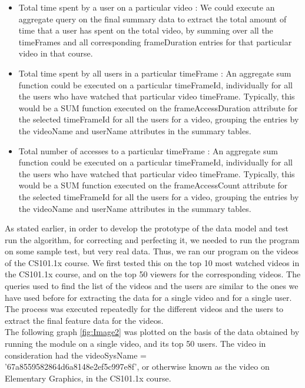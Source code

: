 \documentclass[16pt]{report}
\begin{document}
\begin{itemize}

\item Total time spent by a user on a particular video : We could execute an aggregate query on the final summary data to extract the total amount of time that a user has spent on the total video, by summing over all the timeFrames and all corresponding frameDuration entries for that particular video in that course.

\item Total time spent by all users in a particular timeFrame : An aggregate sum function could be executed on a particular timeFrameId, individually for all the users who have watched that particular video timeFrame. Typically, this would be a SUM function executed on the frameAccessDuration attribute for the selected timeFrameId for all the users for a video, grouping the entries by the videoName and userName attributes in the summary tables.

\item Total number of accesses to a particular timeFrame : An aggregate sum function could be executed on a particular timeFrameId, individually for all the users who have watched that particular video timeFrame. Typically, this would be a SUM function executed on the frameAccessCount attribute for the selected timeFrameId for all the users for a video, grouping the entries by the videoName and userName attributes in the summary tables.

\end{itemize}

As stated earlier, in order to develop the prototype of the data model and test run the algorithm, for correcting and perfecting it, we needed to run the program on some sample test, but very real data. Thus, we ran our program on the videos of the CS101.1x course. We first tested this on the top 10 most watched videos in the CS101.1x course, and on the top 50 viewers for the corresponding videos. The queries used to find the list of the videos and the users are similar to the ones we have used before for extracting the data for a single video and for a single user. The process was executed repeatedly for the different videos and the users to extract the final feature data for the videos.\\

The following graph \ref{fig:Image2} was plotted on the basis of the data obtained by running the module on a single video, and its top 50 users. The video in consideration had the videoSysName = \\'67a8559582864d6a8148e2ef5c997e8f', or otherwise known as the video on Elementary Graphics, in the CS101.1x course.
\end{document}
